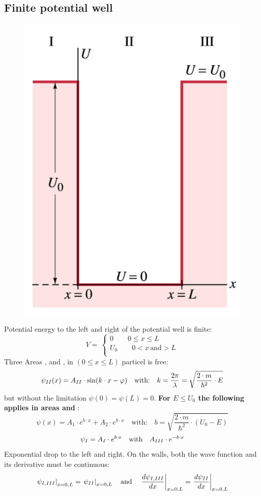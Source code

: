 \subsection{Finite potential well}
\begin{figure}[h]
    \centering
    \includegraphics[width=0.4\columnwidth]{images/potentialwell.png}
    \label{fig:my_image}
\end{figure}
Potential energy to the left and right of the potential well is finite:
\begin{equation*}
 V = \,
\left\{
  \begin{array}{l}
    0 \qquad 0 \le x \le L \\
    U_{0}\qquad 0 < x\,\text{and} > L\\
  \end{array}
\right.
\end{equation*}
Three Areas , and , in  \((0 \le x \le L)\) particel is free:
\begin{equation*}
    \psi_{\rom{2}}(x) = A_{\rom{2}} \cdot \sin(k\cdot x - \varphi) \quad \text{with:}\quad k = \frac{2\pi}{\lambda} = \sqrt{\frac{2\cdot m}{\hbar^2}\cdot E}
\end{equation*}
but without the limitation \(\psi(0) = \psi(L) = 0\).
\textbf{For \(E \le U_0\) the following applies in areas  and }:
\begin{equation*}
    \psi(x) = A_1 \cdot e^{b\cdot x} + A_2 \cdot e^{b\cdot x} \quad \text{with:}\quad b = \sqrt{\frac{2\cdot m}{\hbar^2}\cdot(U_0 - E)}
\end{equation*}
\begin{equation*}
    \psi_{\rom{1}} = A_{\rom{1}} \cdot e^{b\cdot x} \quad  \text{with} \quad A_{\rom{3}} \cdot e^{-b\cdot x} 
\end{equation*}
Exponential drop to the left and right. On the walls, both the wave function and its derivative must be continuous:
\begin{equation*}
    \left.\psi_{\rom{1},\rom{3}}\right|_{x = 0,L} =
    \left.\psi_{\rom{2}}\right|_{x = 0,L}
    \quad \text{and} \quad
    \left.\frac{d\psi_{\rom{1},\rom{3}}}{dx}\right|_{x = 0,L} =
    \left.\frac{d\psi_{\rom{2}}}{dx}\right|_{x = 0,L}
\end{equation*}

